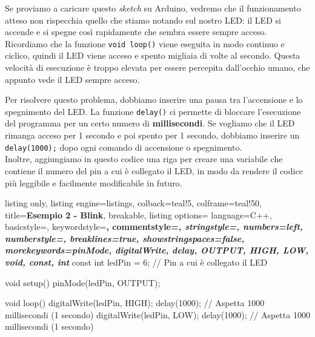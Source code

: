 Se proviamo a caricare questo \textit{sketch} su Arduino, vedremo che il funzionamento atteso non rispecchia quello che stiamo notando sul nostro LED: il LED si accende e si spegne così rapidamente che sembra essere sempre acceso. 
Ricordiamo che la funzione \texttt{void loop()} viene eseguita in modo continuo e ciclico, quindi il LED viene acceso e spento migliaia di volte al secondo. Questa velocità di esecuzione è troppo elevata per essere percepita dall'occhio umano, che appunto vede il LED sempre acceso.

Per risolvere questo problema, dobbiamo inserire una pausa tra l'accensione e lo spegnimento del LED. La funzione \texttt{delay()} ci permette di bloccare l'esecuzione del programma per un certo numero di \textbf{millisecondi}. Se vogliamo che il LED rimanga acceso per 1 secondo e poi spento per 1 secondo, dobbiamo inserire un \texttt{delay(1000);} dopo ogni comando di accensione o spegnimento.\\

Inoltre, aggiungiamo in questo codice una riga per creare una variabile che contiene il numero del pin a cui è collegato il LED, in modo da rendere il codice più leggibile e facilmente modificabile in futuro.

\begin{tcblisting}{
    listing only,
    listing engine=listings,
    colback=teal!5,
    colframe=teal!50,
    title=\textbf{Esempio 2 - Blink},
    breakable,
    listing options={
        language=C++,
        basicstyle=\ttfamily\small,
        keywordstyle=\color{blue!80!black}\bfseries,
        commentstyle=\color{green!50!black}\itshape,
        stringstyle=\color{orange!80!black},
        numbers=left,
        numberstyle=\tiny\color{gray},
        breaklines=true,
        showstringspaces=false,
        morekeywords={pinMode, digitalWrite, delay, OUTPUT, HIGH, LOW, void, const, int}
    }
}
const int ledPin = 6;  // Pin a cui è collegato il LED

void setup() {
    pinMode(ledPin, OUTPUT);
}

void loop() {
    digitalWrite(ledPin, HIGH);
    delay(1000);          // Aspetta 1000 millisecondi (1 secondo)
    digitalWrite(ledPin, LOW);
    delay(1000);          // Aspetta 1000 millisecondi (1 secondo)
}
\end{tcblisting}


